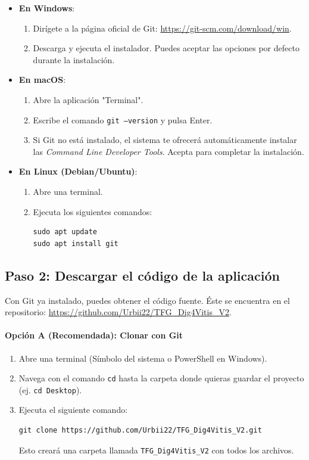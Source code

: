 \begin{itemize}
    \item \textbf{En Windows}:
    \begin{enumerate}
        \item Dirígete a la página oficial de Git: \url{https://git-scm.com/download/win}.
        \item Descarga y ejecuta el instalador. Puedes aceptar las opciones por defecto durante la instalación.
    \end{enumerate}

    \item \textbf{En macOS}:
    \begin{enumerate}
        \item Abre la aplicación "Terminal".
        \item Escribe el comando \texttt{git --version} y pulsa Enter.
        \item Si Git no está instalado, el sistema te ofrecerá automáticamente instalar las \textit{Command Line Developer Tools}. Acepta para completar la instalación.
    \end{enumerate}

    \item \textbf{En Linux (Debian/Ubuntu)}:
    \begin{enumerate}
        \item Abre una terminal.
        \item Ejecuta los siguientes comandos:
        \begin{verbatim}
sudo apt update
sudo apt install git
        \end{verbatim}
    \end{enumerate}
\end{itemize}

\subsection{Paso 2: Descargar el código de la aplicación}
Con Git ya instalado, puedes obtener el código fuente. Éste se encuentra en el repositorio: \url{https://github.com/Urbii22/TFG_Dig4Vitis_V2}.

\paragraph{Opción A (Recomendada): Clonar con Git}
\begin{enumerate}
    \item Abre una terminal (Símbolo del sistema o PowerShell en Windows).
    \item Navega con el comando \texttt{cd} hasta la carpeta donde quieras guardar el proyecto (ej. \texttt{cd Desktop}).
    \item Ejecuta el siguiente comando:
    \begin{verbatim}
git clone https://github.com/Urbii22/TFG_Dig4Vitis_V2.git
    \end{verbatim}
    Esto creará una carpeta llamada \texttt{TFG\_Dig4Vitis\_V2} con todos los archivos.
\end{enumerate}

